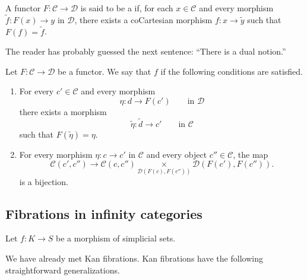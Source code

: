 \documentclass[main.tex]{subfiles}
\begin{document}
\begin{definition}
  \label{def:cocartesian_fibration}
  A functor $F\colon \mathcal{C} \to \mathcal{D}$ is said to be a  if, for each $x \in \mathcal{C}$ and every morphism $\tilde{f}\colon F(x) \to y$ in $\mathcal{D}$, there exists a coCartesian morphism $f\colon x \to \tilde{y}$ such that $F(f) = \tilde{f}$.
\end{definition}

The reader has probably guessed the next sentence: ``There is a dual notion.''

\begin{definition}
  \label{def:fibrant_in_groupoids}
  Let $F\colon \mathcal{C} \to \mathcal{D}$ be a functor. We say that $f$  if the following conditions are satisfied.
  \begin{enumerate}
    \item For every $c' \in \mathcal{C}$ and every morphism
      \begin{equation*}
        \eta\colon d \to F(c') \qquad\text{in }\mathcal{D}
      \end{equation*}
      there exists a morphism
      \begin{equation*}
        \tilde{\eta}\colon \tilde{d} \to c' \qquad\text{in }\mathcal{C}
      \end{equation*}
      such that $F(\tilde{\eta}) = \eta$.

    \item For every morphism $\eta\colon c \to c'$ in $\mathcal{C}$ and every object $c'' \in \mathcal{C}$, the map
      \begin{equation*}
        \mathcal{C}(c', c'') \to\mathcal{C}(c, c'') \underset{\mathcal{D}(F(c), F(c''))}{\times}\mathcal{D}(F(c'), F(c'')).
      \end{equation*}
      is a bijection.
  \end{enumerate}
\end{definition}

\subsection{Fibrations in infinity categories}
\label{ssc:fibrations_in_infinity_categories}

Let $f\colon K \to S$ be a morphism of simplicial sets.

We have already met Kan fibrations. Kan fibrations have the following straightforward generalizations.
\end{document}
